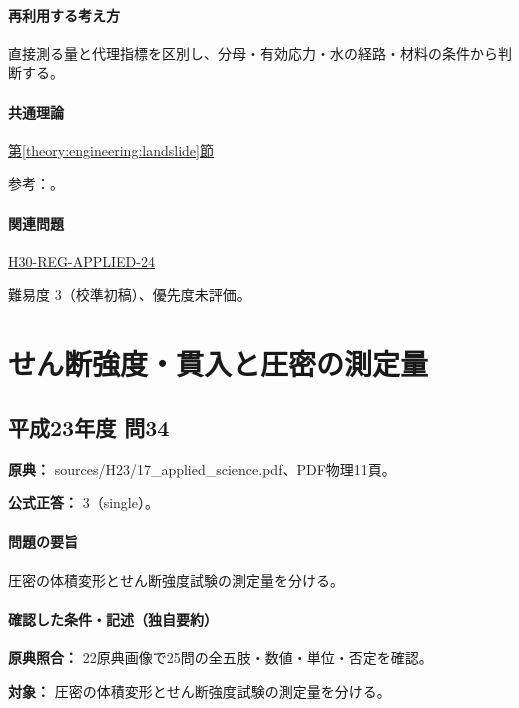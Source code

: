 \paragraph{再利用する考え方} 直接測る量と代理指標を区別し、分母・有効応力・水の経路・材料の条件から判断する。

\paragraph{共通理論} \hyperref[theory:engineering:landslide]{第\ref*{theory:engineering:landslide}節}

\par 参考：\cite{eng52_landslide_ref}。

\paragraph{関連問題} \hyperref[q:h30-reg-applied-24]{H30-REG-APPLIED-24}

\par 難易度 3（校準初稿）、優先度未評価。

\section{せん断強度・貫入と圧密の測定量}

\subsection{平成23年度 問34}
\label{q:h23-reg-applied-34}

\noindent\textbf{原典：} sources/H23/17\_applied\_science.pdf、PDF物理11頁。

\textbf{公式正答：} 3（single）。

\paragraph{問題の要旨} 圧密の体積変形とせん断強度試験の測定量を分ける。

\paragraph{確認した条件・記述（独自要約）}\mbox{}\par

\noindent\textbf{原典照合：} 22原典画像で25問の全五肢・数値・単位・否定を確認。\par

\noindent\textbf{対象：} 圧密の体積変形とせん断強度試験の測定量を分ける。\par


